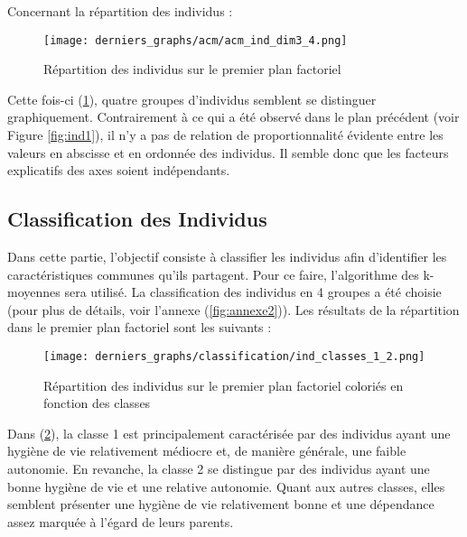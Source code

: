 \documentclass{article}
\begin{document}
Concernant la répartition des individus :

\begin{figure}[H]
  \centering
  \texttt{[image: derniers\_graphs/acm/acm\_ind\_dim3\_4.png]} 
  \caption{Répartition des individus sur le premier plan factoriel}
  \label{fig:ind2}
\end{figure}

Cette fois-ci (\ref{fig:ind2}), quatre groupes d'individus semblent se distinguer graphiquement. Contrairement à ce qui a été observé dans le plan précédent (voir Figure \ref{fig:ind1}), il n'y a pas de relation de proportionnalité évidente entre les valeurs en abscisse et en ordonnée des individus. Il semble donc que les facteurs explicatifs des axes soient indépendants.

\subsection{Classification des Individus} \label{classification}
Dans cette partie, l'objectif consiste à classifier les individus afin d'identifier les caractéristiques communes qu'ils partagent. Pour ce faire, l'algorithme des k-moyennes sera utilisé. La classification des individus en 4 groupes a été choisie (pour plus de détails, voir l'annexe (\ref{fig:annexe2})). Les résultats de la répartition dans le premier plan factoriel sont les suivants :
\begin{figure}[H]
  \centering
  \texttt{[image: derniers\_graphs/classification/ind\_classes\_1\_2.png]} 
  \caption{Répartition des individus sur le premier plan factoriel coloriés en fonction des classes}
  \label{fig:class1}
\end{figure}

Dans (\ref{fig:class1}), la classe 1 est principalement caractérisée par des individus ayant une hygiène de vie relativement médiocre et, de manière générale, une faible autonomie. En revanche, la classe 2 se distingue par des individus ayant une bonne hygiène de vie et une relative autonomie. Quant aux autres classes, elles semblent présenter une hygiène de vie relativement bonne et une dépendance assez marquée à l'égard de leurs parents.
\end{document}

